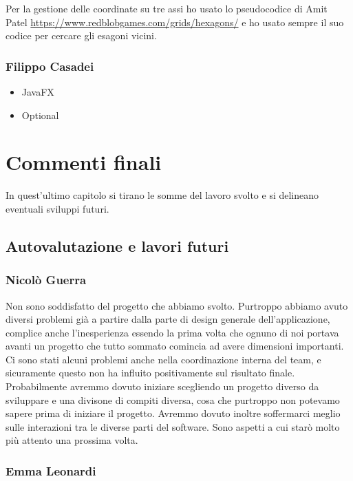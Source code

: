 \documentclass[a4paper,12pt]{report}
\begin{document}
Per la gestione delle coordinate su tre assi ho usato lo pseudocodice di Amit Patel \url{https://www.redblobgames.com/grids/hexagons/} e ho usato sempre il suo codice per cercare gli esagoni vicini.

\subsection{Filippo Casadei}
\begin{itemize}
	\item JavaFX
	\item Optional
\end{itemize}

\chapter{Commenti finali}

In quest'ultimo capitolo si tirano le somme del lavoro svolto e si delineano eventuali sviluppi
futuri.

\section{Autovalutazione e lavori futuri}

\subsection{Nicolò Guerra}

Non sono soddisfatto del progetto che abbiamo svolto. Purtroppo abbiamo avuto diversi problemi già a partire dalla parte di design generale dell'applicazione, complice anche l'inesperienza essendo la prima
volta che ognuno di noi portava avanti un progetto che tutto sommato comincia ad avere dimensioni importanti. Ci sono stati alcuni problemi anche nella coordinazione interna del team, e sicuramente questo
non ha influito positivamente sul risultato finale. Probabilmente avremmo dovuto iniziare scegliendo un progetto diverso da sviluppare e una divisone di compiti diversa, cosa che purtroppo non potevamo sapere
prima di iniziare il progetto. Avremmo dovuto inoltre soffermarci meglio sulle interazioni tra le diverse parti del software. Sono aspetti a cui starò molto più attento una prossima volta.

\subsection{Emma Leonardi}
\end{document}
